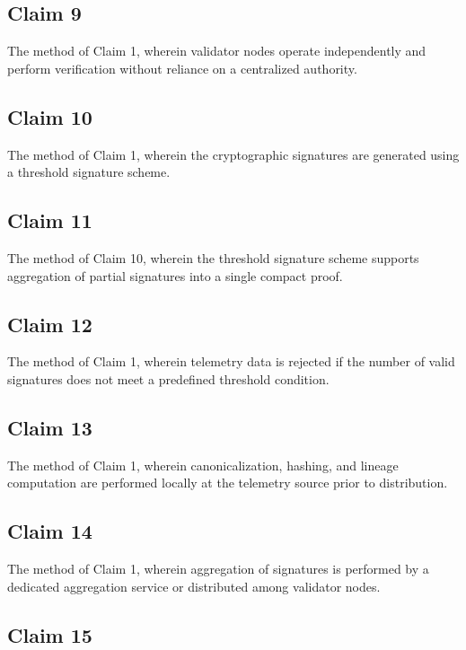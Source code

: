 \subsection{Claim 9}

The method of Claim 1, wherein validator nodes operate independently and perform verification without reliance on a centralized authority.

\subsection{Claim 10}

The method of Claim 1, wherein the cryptographic signatures are generated using a threshold signature scheme.

\subsection{Claim 11}

The method of Claim 10, wherein the threshold signature scheme supports aggregation of partial signatures into a single compact proof.

\subsection{Claim 12}

The method of Claim 1, wherein telemetry data is rejected if the number of valid signatures does not meet a predefined threshold condition.

\subsection{Claim 13}

The method of Claim 1, wherein canonicalization, hashing, and lineage computation are performed locally at the telemetry source prior to distribution.

\subsection{Claim 14}

The method of Claim 1, wherein aggregation of signatures is performed by a dedicated aggregation service or distributed among validator nodes.

\subsection{Claim 15}

